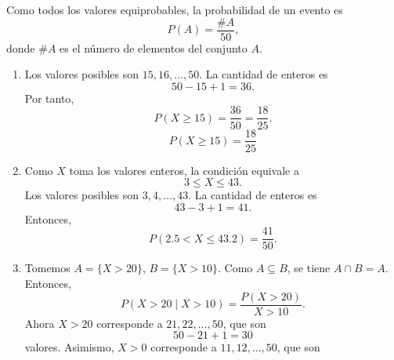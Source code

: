 \documentclass[12pt,a4paper]{article}
\begin{document}
    \begin{solucion}
        Como todos los valores equiprobables, la probabilidad de un evento es
        \begin{equation*}
            P(A)=\frac{\#A}{50},
        \end{equation*}
        donde $\#A$ es el número de elementos del conjunto $A$.
        \begin{enumerate}
            \item[(a)] Los valores posibles son $15,16,\dots,50$. La cantidad de enteros es
            \begin{equation*}
                50-15+1=36.
            \end{equation*}
            Por tanto,
            \begin{equation*}
                P(X\geq15)=\frac{36}{50}=\frac{18}{25}.
            \end{equation*}
            \begin{equation*}
                P(X\geq15)=\frac{18}{25}
            \end{equation*}
            \item[(b)] Como $X$ toma los valores enteros, la condición equivale a
            \begin{equation*}
                3\leq X\leq43.
            \end{equation*}
            Los valores posibles son $3,4,\dots,43$. La cantidad de enteros es
            \begin{equation*}
                43-3+1=41.
            \end{equation*}
            Entonces,
            \begin{equation*}
                P(2.5\lt X\leq43.2)=\frac{41}{50}.
            \end{equation*}
            \item[(c)] Tomemos $A=\{X\gt20\}$, $B=\{X\gt10\}$. Como $A\subseteq B$, se tiene $A\cap B=A$.
            Entonces,
            \begin{equation*}
                P(X\gt20\mid X\gt10)=\frac{P(X\gt20)}{X\gt10}.
            \end{equation*}
            Ahora $X\gt20$ corresponde a $21,22,\dots,50$, que son
            \begin{equation*}
                50-21+1=30
            \end{equation*}
            valores. Asimismo, $X\gt0$ corresponde a $11,12,\dots,50$, que son
            \begin{equation*}

\end{equation*}
\end{enumerate}
\end{solucion}
\end{document}

